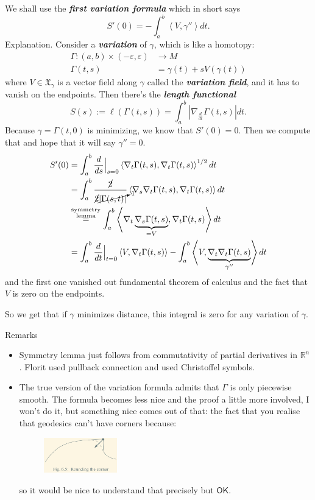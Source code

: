We shall use the \textit{\textbf{first variation formula}} which in short says
\[S'(0)=-\int_a^b \left<V,\gamma''\right>dt.\]
Explanation. Consider a \textit{\textbf{variation}} of \(\gamma\), which is like a homotopy:
\begin{align*}
	\Gamma: (a,b)\times(-\varepsilon,\varepsilon) &\longrightarrow M \\
	\Gamma(t,s) &=\gamma(t)+sV(\gamma(t))
\end{align*}
where \(V \in \mathfrak{X}_\gamma\) is a vector field along \(\gamma\) called the \textit{\textbf{variation field}}, and it has to vanish on the endpoints. Then there's the \textit{\textbf{length functional}} 
\[S(s):=\ell(\Gamma(t,s))=\int_a^b|\nabla_{\frac{d}{dt}}\Gamma(t,s)|dt.\]
Because \(\gamma=\Gamma(t,0)\) is minimizing, we know that \(S'(0)=0\). Then we compute that and hope that it will say \(\gamma''=0\).
\begin{align*}
S'(0)&=\int_a^b\frac{d}{ds}\Big|_{s=0}\left<\nabla_t\Gamma(t,s),\nabla_t\Gamma(t,s)\right>^{1/2}dt\\
&=\int_a^b \frac{\cancel{2}}{\cancel{2}\cancelto{1}{\left|\Gamma(s,t)\right|}}\left<\nabla_s \nabla_t\Gamma(t,s),\nabla_t\Gamma(t,s)\right>dt\\
&\overset{\substack{\text{symmetry}  \\ \text{lemma} }}{=}\int_a^b\left<\nabla_t\underbrace{\nabla_s\Gamma(t,s)}_{=V},\nabla_t\Gamma(t,s)\right>dt\\
&=\int_a^b\frac{d}{dt}\Big|_{t=0}\left<V,\nabla_t\Gamma(t,s)\right>-\int_a^b\left<V,\underbrace{\nabla_t\nabla_t\Gamma(t,s)}_{\gamma''}\right>dt
\end{align*}
and the first one vanished out fundamental theorem of calculus and the fact that \(V\) is zero on the endpoints.

So we get that if \(\gamma\) minimizes distance, this integral is zero for any variation of \(\gamma\).

\begin{thing8}{Remarks}\leavevmode
\begin{itemize}
\item Symmetry lemma just follows from commutativity of partial derivatives in \(\mathbb{R}^{n}\). Florit used pullback connection and \cite{ler} used Christoffel symbols.
\item The true version of the variation formula admits that \(\Gamma\) is only piecewise smooth. The formula becomes less nice and the proof a little more involved, I won't do it, but something nice comes out of that: the fact that you realise that geodesics can't have corners because:
	\begin{figure}[H]
		\centering
		\includegraphics[width=0.3\textwidth]{fig3}
	\end{figure}
	so it would be nice to understand that precisely but \(\mathsf{OK}\).
\end{itemize}
\end{thing8}



